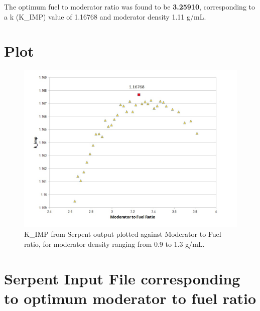 \documentclass[14pt,a4paper]{article} %
\begin{document}
The optimum fuel to moderator ratio was found to be \textbf{3.25910}, corresponding to a k (K\_IMP) value of 1.16768 and moderator density 1.11 g/mL.

\section{Plot}

\begin{figure}[H]
\centering
\includegraphics[scale=0.6]{plot}
\caption{K\_IMP from Serpent output plotted against Moderator to Fuel ratio, for moderator density ranging from 0.9 to 1.3 g/mL.}
\end{figure}

\pagebreak

\section{Serpent Input File corresponding to optimum moderator to fuel ratio}
\end{document}
